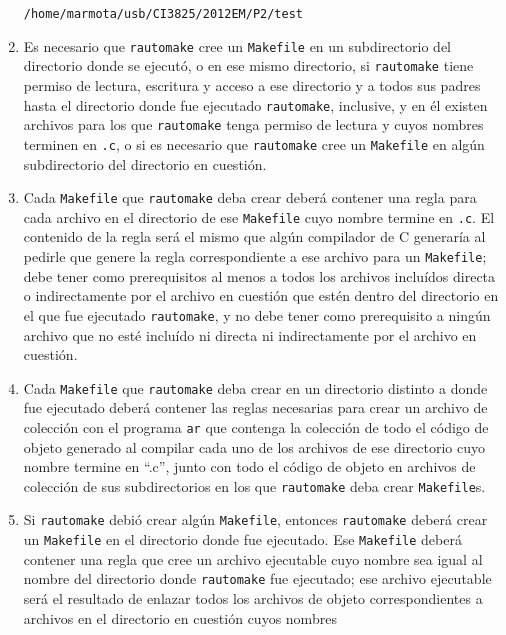 \documentclass[]{article}
\begin{document}
\begin{enumerate}[1.]
\begin{verbatim}
/home/marmota/usb/CI3825/2012EM/P2/test
\end{verbatim}
\item
  Es necesario que \texttt{rautomake} cree un \texttt{Makefile} en un
  subdirectorio del directorio donde se ejecutó, o en ese mismo
  directorio, si \texttt{rautomake} tiene permiso de lectura, escritura
  y acceso a ese directorio y a todos sus padres hasta el directorio
  donde fue ejecutado \texttt{rautomake}, inclusive, y en él existen
  archivos para los que \texttt{rautomake} tenga permiso de lectura y
  cuyos nombres terminen en \texttt{.c}, o si es necesario que
  \texttt{rautomake} cree un \texttt{Makefile} en algún subdirectorio
  del directorio en cuestión.
\item
  Cada \texttt{Makefile} que \texttt{rautomake} deba crear deberá
  contener una regla para cada archivo en el directorio de ese
  \texttt{Makefile} cuyo nombre termine en \texttt{.c}. El contenido de
  la regla será el mismo que algún compilador de C generaría al pedirle
  que genere la regla correspondiente a ese archivo para un
  \texttt{Makefile}; debe tener como prerequisitos al menos a todos los
  archivos incluídos directa o indirectamente por el archivo en cuestión
  que estén dentro del directorio en el que fue ejecutado
  \texttt{rautomake}, y no debe tener como prerequisito a ningún archivo
  que no esté incluído ni directa ni indirectamente por el archivo en
  cuestión.
\item
  Cada \texttt{Makefile} que \texttt{rautomake} deba crear en un
  directorio distinto a donde fue ejecutado deberá contener las reglas
  necesarias para crear un archivo de colección con el programa
  \texttt{ar} que contenga la colección de todo el código de objeto
  generado al compilar cada uno de los archivos de ese directorio cuyo
  nombre termine en ``.c'', junto con todo el código de objeto en
  archivos de colección de sus subdirectorios en los que
  \texttt{rautomake} deba crear \texttt{Makefile}s.
\item
  Si \texttt{rautomake} debió crear algún \texttt{Makefile}, entonces
  \texttt{rautomake} deberá crear un \texttt{Makefile} en el directorio
  donde fue ejecutado. Ese \texttt{Makefile} deberá contener una regla
  que cree un archivo ejecutable cuyo nombre sea igual al nombre del
  directorio donde \texttt{rautomake} fue ejecutado; ese archivo
  ejecutable será el resultado de enlazar todos los archivos de objeto
  correspondientes a archivos en el directorio en cuestión cuyos nombres

\end{enumerate}
\end{document}
